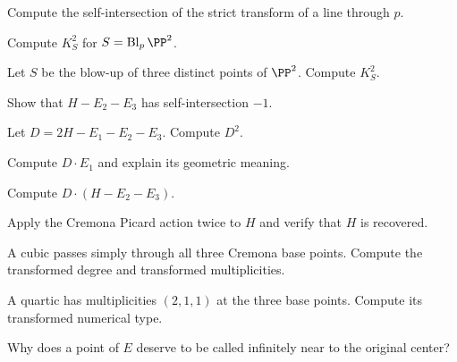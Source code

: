 \begin{exercise}\label{exr:vi45-10}
Compute the self-intersection of the strict transform of a line through \(p\).
\end{exercise}

\begin{exercise}\label{exr:vi45-11}
Compute \(K_S^2\) for \(S=\Bl_p\PP^2\).
\end{exercise}

\begin{exercise}\label{exr:vi45-12}
Let \(S\) be the blow-up of three distinct points of \(\PP^2\).  Compute \(K_S^2\).
\end{exercise}

\begin{exercise}\label{exr:vi45-13}
Show that \(H-E_2-E_3\) has self-intersection \(-1\).
\end{exercise}

\begin{exercise}\label{exr:vi45-14}
Let \(D=2H-E_1-E_2-E_3\).  Compute \(D^2\).
\end{exercise}

\begin{exercise}\label{exr:vi45-15}
Compute \(D\cdot E_1\) and explain its geometric meaning.
\end{exercise}

\begin{exercise}\label{exr:vi45-16}
Compute \(D\cdot(H-E_2-E_3)\).
\end{exercise}

\begin{exercise}\label{exr:vi45-17}
Apply the Cremona Picard action twice to \(H\) and verify that \(H\) is recovered.
\end{exercise}

\begin{exercise}\label{exr:vi45-18}
A cubic passes simply through all three Cremona base points.  Compute the transformed degree and transformed multiplicities.
\end{exercise}

\begin{exercise}\label{exr:vi45-19}
A quartic has multiplicities \((2,1,1)\) at the three base points.  Compute its transformed numerical type.
\end{exercise}

\begin{exercise}\label{exr:vi45-20}
Why does a point of \(E\) deserve to be called infinitely near to the original center?
\end{exercise}

